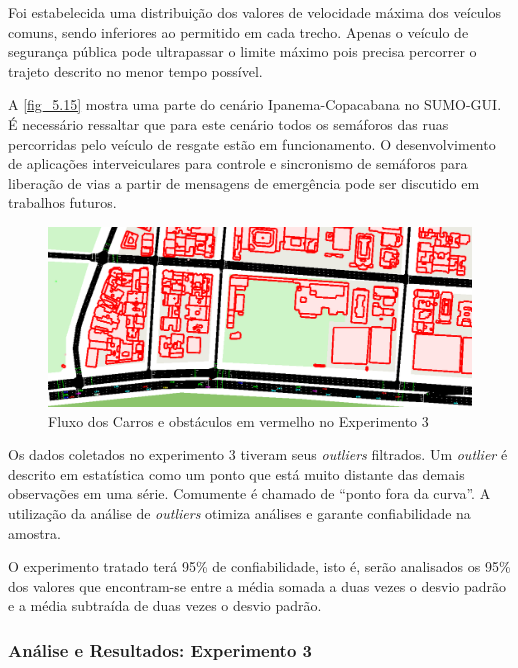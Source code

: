 \documentclass[
12pt,				%
openright,			%
oneside,			%
a4paper,			%
brazil,				%
]{abntex2}
\begin{document}
	\par Foi estabelecida uma distribuição dos valores de velocidade máxima dos veículos comuns, sendo inferiores ao permitido em cada trecho. Apenas o veículo de segurança pública pode ultrapassar o limite máximo pois precisa percorrer o trajeto descrito no menor tempo possível.
	
	\par A \autoref{fig_5.15} mostra uma parte do cenário Ipanema-Copacabana no SUMO-GUI. É necessário ressaltar que para este cenário todos os semáforos das ruas percorridas pelo veículo de resgate estão em funcionamento. O desenvolvimento de aplicações interveiculares para controle e sincronismo de semáforos para liberação de vias a partir de mensagens de emergência pode ser discutido em trabalhos futuros.
	
	\begin{figure}[H]
		\centering
		\includegraphics[scale=.34]{figuras/cap5/515Cenario3SUMO}
		\caption{\label{fig_5.15}Fluxo dos Carros e obstáculos em vermelho no  Experimento 3}
	\end{figure}
	
	\par Os dados coletados no experimento 3 tiveram seus \textit{outliers} filtrados. Um \textit{outlier} é descrito em estatística como um ponto que está muito distante das demais observações em uma série. Comumente é chamado de “ponto fora da curva”. A utilização da análise de \textit{outliers} otimiza análises e garante confiabilidade na amostra.
	
	\par O experimento tratado terá 95\% de confiabilidade, isto é, serão analisados os 95\% dos valores que encontram-se entre a média somada a duas vezes o desvio padrão e a média subtraída de duas vezes o desvio padrão.
	
	\subsubsection{Análise e Resultados: Experimento 3}
	
\end{document}
